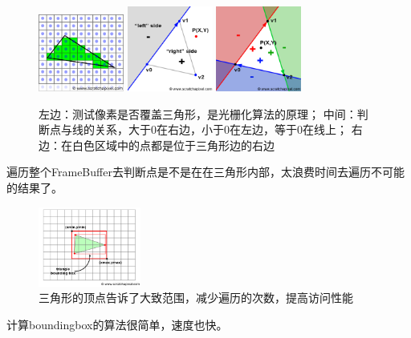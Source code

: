 \begin{figure}[h]
    \centering
    \includegraphics[width=0.25\textwidth]{images/rasterization-triangle1.png}
    \hspace{0.1cm}
    \includegraphics[width=0.25\textwidth]{images/rasterization-triangle2.png}
    \hspace{0.1cm}
    \includegraphics[width=0.25\textwidth]{images/rasterization-triangle3.png}
    \caption{左边：测试像素是否覆盖三角形，是光栅化算法的原理；
    中间：判断点与线的关系，大于0在右边，小于0在左边，等于0在线上；
    右边：在白色区域中的点都是位于三角形边的右边
    }    
\end{figure}
遍历整个FrameBuffer去判断点是不是在在三角形内部，太浪费时间去遍历不可能的结果了。
\begin{figure}[h]
    \centering
    \includegraphics[width=0.3\textwidth]{images/rasterization-boundingbox.png}
    \caption {三角形的顶点告诉了大致范围，减少遍历的次数，提高访问性能}
\end{figure}
计算boundingbox的算法很简单，速度也快。

